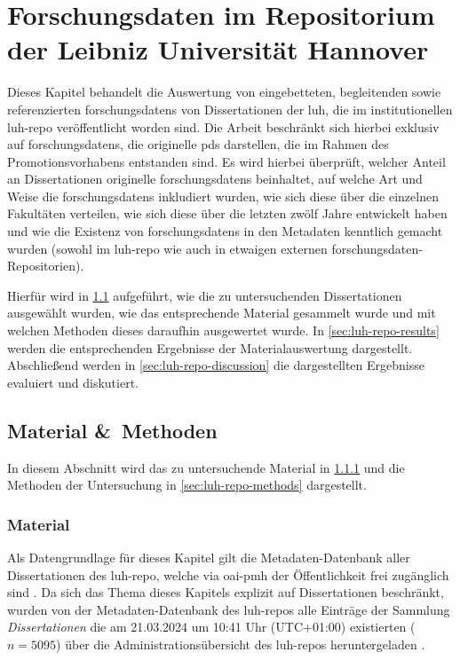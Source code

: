 \chapter{Forschungsdaten im Repositorium der Leibniz Universität Hannover}\label{ch:luh-repo}
Dieses Kapitel behandelt die Auswertung von eingebetteten, begleitenden sowie referenzierten \glspl{forschungsdaten} von Dissertationen der \gls{luh}, die im institutionellen \gls{luh-repo} veröffentlicht worden sind.
Die Arbeit beschränkt sich hierbei exklusiv auf \glspl{forschungsdaten}, die originelle \glspl{pd} darstellen, die im Rahmen des Promotionsvorhabens entstanden sind.
Es wird hierbei überprüft, welcher Anteil an Dissertationen originelle \glspl{forschungsdaten} beinhaltet, auf welche Art und Weise die \glspl{forschungsdaten} inkludiert wurden, wie sich diese über die einzelnen Fakultäten verteilen, wie sich diese über die letzten zwölf Jahre entwickelt haben und wie die Existenz von \glspl{forschungsdaten} in den Metadaten kenntlich gemacht wurden (sowohl im \gls{luh-repo} wie auch in etwaigen externen \gls{forschungsdaten}-Repositorien).

Hierfür wird in \cref{sec:luh-repo-material-methods} aufgeführt, wie die zu untersuchenden Dissertationen ausgewählt wurden, wie das entsprechende Material gesammelt wurde und mit welchen Methoden dieses daraufhin ausgewertet wurde.
In \cref{sec:luh-repo-results} werden die entsprechenden Ergebnisse der Materialauswertung dargestellt.
Abschließend werden in \cref{sec:luh-repo-discussion} die dargestellten Ergebnisse evaluiert und diskutiert.

\section{Material \&\ Methoden}\label{sec:luh-repo-material-methods}
In diesem Abschnitt wird das zu untersuchende Material in \cref{sec:luh-repo-material} und die Methoden der Untersuchung in \cref{sec:luh-repo-methods} dargestellt.

\subsection{Material}\label{sec:luh-repo-material}
Als Datengrundlage für dieses Kapitel gilt die Metadaten-Datenbank aller Dissertationen des \gls{luh-repo}, welche via \gls{oai-pmh} der Öffentlichkeit frei zugänglich sind \autocite{luh-repo}.
Da sich das Thema dieses Kapitels explizit auf Dissertationen beschränkt, wurden von der Metadaten-Datenbank des \gls{luh-repo}s alle Einträge der Sammlung \textit{Dissertationen} die am 21.03.2024 um 10:41 Uhr (UTC+01:00) existierten ($n=5095$) über die Administrationsübersicht des \gls{luh-repo}s heruntergeladen \autocite{my-dataset}.

